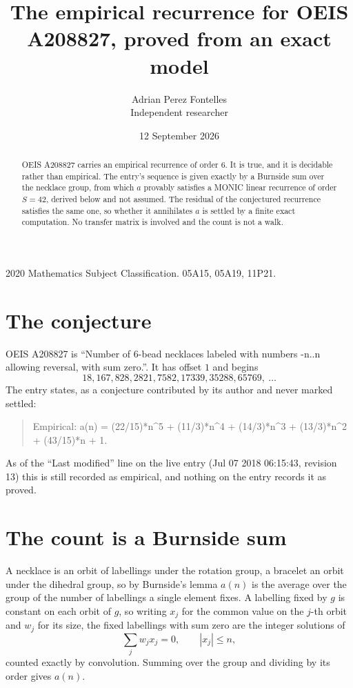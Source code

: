 \documentclass[11pt,a4paper]{article}
\title{The empirical recurrence for OEIS A208827, proved from an exact model}
\author{Adrian Perez Fontelles\\ \small Independent researcher}
\date{12 September 2026}
\theoremstyle{plain}
\theoremstyle{definition}
\begin{document}
\maketitle

\begin{abstract}
OEIS A208827 carries an empirical recurrence of order $6$. It is true, and it is
decidable rather than empirical. The entry's sequence is given exactly by a Burnside sum over the necklace group, from
which $a$ provably satisfies a MONIC linear recurrence of order $S=42$, derived below and not
assumed. The residual of the conjectured recurrence satisfies the same one, so whether it
annihilates $a$ is settled by a finite exact computation. No transfer matrix is involved and
the count is not a walk.
\end{abstract}

\noindent\small 2020 Mathematics Subject Classification. 05A15, 05A19, 11P21.\normalsize

\section{The conjecture}

OEIS A208827 is ``Number of 6-bead necklaces labeled with numbers -n..n allowing reversal, with sum zero.''. It has offset $1$ and begins
\[
18, 167, 828, 2821, 7582, 17339, 35288, 65769,\ \dots
\]
The entry states, as a conjecture contributed by its author and never marked settled:
\begin{quote}
Empirical: a(n) = (22/15)*n\^{}5 + (11/3)*n\^{}4 + (14/3)*n\^{}3 + (13/3)*n\^{}2 + (43/15)*n + 1.
\end{quote}
As of the ``Last modified'' line on the live entry (Jul 07 2018 06:15:43, revision 13)
this is still recorded as empirical, and nothing on the entry records it as proved.

\section{The count is a Burnside sum}

A necklace is an orbit of labellings under the rotation group, a bracelet an orbit under the
dihedral group, so by Burnside's lemma $a(n)$ is the average over the group of the number of
labellings a single element fixes. A labelling fixed by $g$ is constant on each orbit of $g$,
so writing $x_j$ for the common value on the $j$-th orbit and $w_j$ for its size, the fixed
labellings with sum zero are the integer solutions of
\[
\sum_j w_jx_j = 0,\qquad |x_j|\le n,
\]
counted exactly by convolution. Summing over the group and dividing by its order gives $a(n)$.
\end{document}

